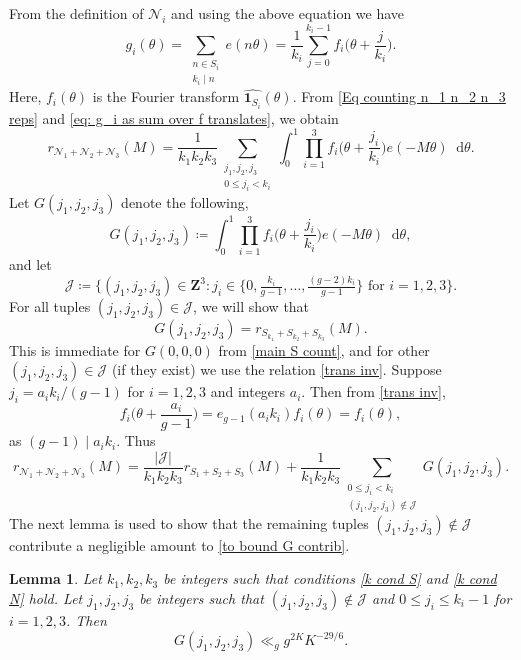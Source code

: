 \documentclass[hidelinks,11pt,reqno]{amsart}
\renewcommand{\leq}{\leqslant}
\newcommand{\Z}{\ensuremath{\mathbf{Z}}}
\newcommand{\st}{\ensuremath{:}}
\newcommand{\ind}{\mathbf{1}}
\newcommand*\dif{\mathop{}\!\mathrm{d}}
\newcommand{\ru}[1]{e_{g-1}(#1)}
\newtheorem{lemma}[prop]{Lemma}
\theoremstyle{remark}
\begin{document}
From the definition of $\mathcal{N}_{i}$ and using the above equation we have
\begin{equation}\label{eq: g_i as sum over f translates}
    g_{i}(\theta)=\sum_{\substack{n\in S_{i}\\ k_{i}\mid n}}e(n\theta)=\frac{1}{k_{i}}\sum_{j=0}^{k_{i}-1}f_{i}\big(\theta+\frac{j}{k_{i}}\big).
\end{equation}
Here, $f_{i}(\theta)$ is the Fourier transform $\widehat{\ind_{S_{i}}}(\theta)$. From \cref{Eq counting n_1 n_2 n_3 reps} and \cref{eq: g_i as sum over f translates}, we obtain
\begin{equation}\label{count for niven numbers}
    r_{\mathcal{N}_{1}+\mathcal{N}_{2}+\mathcal{N}_{3}}(M)=\frac{1}{k_{1}k_{2}k_{3}}\sum_{\substack{j_{1},j_{2},j_{3}\\0\leq j_{i}<k_{i}}}\int_{0}^{1}\prod_{i=1}^{3}f_{i}\big(\theta+\frac{j_{i}}{k_{i}}\big)e(-M\theta)\dif \theta.
\end{equation}
Let $G(j_{1},j_{2},j_{3})$ denote the following,
\[G(j_{1},j_{2},j_{3})\coloneq \int_{0}^{1}\prod_{i=1}^{3}f_{i}\big(\theta+\frac{j_{i}}{k_{i}}\big)e(-M\theta)\dif \theta,\]
and let \begin{equation}\label{J defn}
    \mathcal{J}\coloneq\{(j_{1},j_{2},j_{3})\in \Z^{3} \st j_{i}\in \{0,\tfrac{k_{i}}{g-1},\ldots,\tfrac{(g-2)k_{i}}{g-1}\} \textrm{ for }i=1,2,3\}.
\end{equation} For all tuples $(j_{1},j_{2},j_{3})\in \mathcal{J}$, we will show that
\[G(j_{1},j_{2},j_{3})=r_{S_{k_{1}}+S_{k_{2}}+S_{k_{3}}}(M).\]
This is immediate for $G(0,0,0)$ from \cref{main S count}, and for other $(j_{1},j_{2},j_{3})\in \mathcal{J}$ (if they exist) we use the relation \cref{trans inv}. Suppose $j_{i}=a_{i}k_{i}/(g-1)$ for $i=1,2,3$ and integers $a_{i}$. Then from \cref{trans inv},
\[f_{i}\Big(\theta+\frac{a_{i}}{g-1}    \Big )=\ru{a_{i}k_{i}}f_{i}(\theta)=f_{i}(\theta),\]
as $(g-1)\mid a_{i}k_{i}$. Thus
\begin{equation}\label{to bound G contrib}
    r_{\mathcal{N}_{1}+\mathcal{N}_{2}+\mathcal{N}_{3}}(M)=\frac{|\mathcal{J}|}{k_{1}k_{2}k_{3}}r_{S_{1}+S_{2}+S_{3}}(M)+\frac{1}{k_{1}k_{2}k_{3}}\sum_{\substack{0\leq j_{i}<k_{i}\\(j_{1},j_{2},j_{3})\notin \mathcal{J}}}G(j_{1},j_{2},j_{3}).
\end{equation}
The next lemma is used to show that the remaining tuples $(j_{1},j_{2},j_{3})\notin \mathcal{J}$ contribute a negligible amount to \cref{to bound G contrib}. 
\begin{lemma}\label{G small}
Let $k_{1},k_{2},k_{3}$ be integers such that conditions \cref{k cond S} and \cref{k cond N} hold. Let $j_{1},j_{2},j_{3}$ be integers such that $(j_{1},j_{2},j_{3})\notin \mathcal{J}$ and $0\leq j_{i}\leq k_{i}-1$ for $i=1,2,3$. Then 
    \[G(j_{1},j_{2},j_{3})\ll_{g} g^{2K}K^{-29/6}.\]
\end{lemma}
\end{document}
